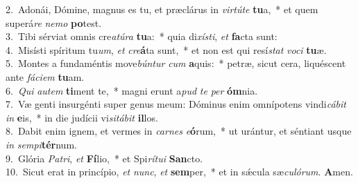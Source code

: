 {2.~}Adonái, Dómine, magnus es tu, et præclárus in \textit{vir}\textit{tú}\textit{te} \textbf{tu}a,~* et quem superá\textit{re} \textit{ne}\textit{mo} \textbf{po}test.\\
{3.~}Tibi sérviat omnis cre\textit{a}\textit{tú}\textit{ra} \textbf{tu}a:~* quia di\textit{xí}\textit{sti}, \textit{et} \textbf{fa}cta sunt:\\
{4.~}Misísti spíritum tu\textit{um}, \textit{et} \textit{cre}\textbf{á}ta sunt,~* et non est qui resí\textit{stat} \textit{vo}\textit{ci} \textbf{tu}æ.\\
{5.~}Montes a fundaméntis move\textit{bún}\textit{tur} \textit{cum} \textbf{a}quis:~* petræ, sicut cera, liquéscent ante \textit{fá}\textit{ci}\textit{em} \textbf{tu}am.\\
{6.~}\textit{Qui} \textit{au}\textit{tem} \textbf{ti}ment te,~* magni erunt a\textit{pud} \textit{te} \textit{per} \textbf{óm}nia.\\
{7.~}Væ genti insurgénti super genus meum: Dóminus enim omnípotens vindi\textit{cá}\textit{bit} \textit{in} \textbf{e}is,~* in die judícii vi\textit{si}\textit{tá}\textit{bit} \textbf{il}los.\\
{8.~}Dabit enim ignem, et vermes in \textit{car}\textit{nes} \textit{e}\textbf{ó}rum,~* ut urántur, et séntiant usque \textit{in} \textit{sem}\textit{pi}\textbf{tér}num.\\
{9.~}Glória \textit{Pa}\textit{tri}, \textit{et} \textbf{Fí}lio,~* et Spi\textit{rí}\textit{tu}\textit{i} \textbf{San}cto.\\
{10.~}Sicut erat in princípio, \textit{et} \textit{nunc}, \textit{et} \textbf{sem}per,~* et in sǽcula sæ\textit{cu}\textit{ló}\textit{rum}. \textbf{A}men.\\
